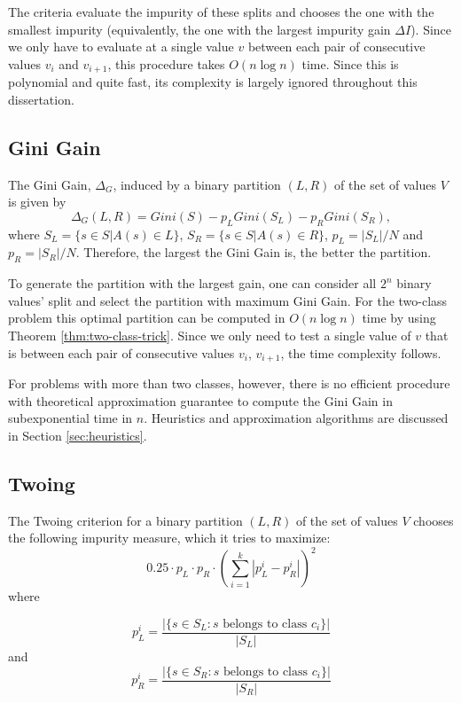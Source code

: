 The criteria evaluate the impurity of these splits and chooses the one with the smallest impurity (equivalently, the one with the largest impurity gain $\Delta I$). Since we only have to evaluate at a single value $v$ between each pair of consecutive values $v_i$ and $v_{i+1}$, this procedure takes $O(n \log n)$ time. Since this is polynomial and quite fast, its complexity is largely ignored throughout this dissertation.

\subsection{Gini Gain}

The Gini Gain, $\Delta_G$, induced by a binary partition $(L,R)$ of the set of values $V$ is given by 
\begin{equation}
 \Delta_G (L,R) = Gini(S) -
p_L Gini(S_L) - p_R Gini(S_R),
\label{eq:Ginigain}
\end{equation}
where $S_L= \{ s \in S | A(s) \in L \}$, $S_R= \{ s \in S | A(s) \in R \}$,
 $p_L=|S_L| /N $
and $p_R=|S_R| /N$. Therefore, the largest the Gini Gain is, the better the partition.

To generate the partition with the largest gain, one can consider all $2^n$ binary values' split and select the partition with maximum Gini Gain.
For the two-class problem this optimal partition can be computed  in $O(n \log n)$ time by using Theorem \ref{thm:two-class-trick}. Since we only need to test a single value of $v$ that is between each pair of consecutive values $v_i$, $v_{i+1}$, the time complexity follows.

For problems with more than two classes, however, there is no efficient procedure with theoretical approximation guarantee to compute the Gini Gain in subexponential time in $n$. Heuristics and approximation algorithms are discussed in Section \ref{sec:heuristics}.

\subsection{Twoing}
The Twoing criterion
for a  binary partition $(L,R)$ 
of the set of values $V$ chooses the following impurity measure, which it tries to maximize:
$$ 0.25 \cdot p_L \cdot p_R  \cdot \left ( \sum_{i=1}^k | p_L^i - p_R^i | \right )^2$$
where

$$ p_L^i= \frac{|\{s \in S_L: s \mbox{ belongs to class } c_i \}|}{ |S_L|} $$
 and 
$$ p_R^i= \frac{|\{s \in S_R: s \mbox{ belongs to class } c_i\} |}{ |S_R|} $$

